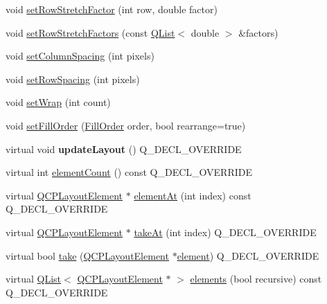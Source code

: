 \begin{DoxyCompactItemize}
\item 
void \hyperlink{class_q_c_p_layout_grid_a7b0273de5369bd93d942edbaf5b166ec}{set\+Row\+Stretch\+Factor} (int row, double factor)
\item 
void \hyperlink{class_q_c_p_layout_grid_a200b45f9c908f96ebadaa3c8d87a2782}{set\+Row\+Stretch\+Factors} (const \hyperlink{class_q_list}{Q\+List}$<$ double $>$ \&factors)
\item 
void \hyperlink{class_q_c_p_layout_grid_a3a49272aba32bb0fddc3bb2a45a3dba0}{set\+Column\+Spacing} (int pixels)
\item 
void \hyperlink{class_q_c_p_layout_grid_aaef2cd2d456197ee06a208793678e436}{set\+Row\+Spacing} (int pixels)
\item 
void \hyperlink{class_q_c_p_layout_grid_ab36af18d77e4428386d02970382ee598}{set\+Wrap} (int count)
\item 
void \hyperlink{class_q_c_p_layout_grid_affc2f3cfd22f28698c5b29b960d2a391}{set\+Fill\+Order} (\hyperlink{class_q_c_p_layout_grid_a7d49ee08773de6b2fd246edfed353cca}{Fill\+Order} order, bool rearrange=true)
\item 
\mbox{\label{class_q_c_p_layout_grid_a6cf43f14d3fa335fd8758561ccf1f78c}} 
virtual void {\bfseries update\+Layout} () Q\+\_\+\+D\+E\+C\+L\+\_\+\+O\+V\+E\+R\+R\+I\+DE
\item 
virtual int \hyperlink{class_q_c_p_layout_grid_a9a8942aface780a02445ebcf14c48513}{element\+Count} () const Q\+\_\+\+D\+E\+C\+L\+\_\+\+O\+V\+E\+R\+R\+I\+DE
\item 
virtual \hyperlink{class_q_c_p_layout_element}{Q\+C\+P\+Layout\+Element} $\ast$ \hyperlink{class_q_c_p_layout_grid_a4288f174082555f6bd92021bdedb75dc}{element\+At} (int index) const Q\+\_\+\+D\+E\+C\+L\+\_\+\+O\+V\+E\+R\+R\+I\+DE
\item 
virtual \hyperlink{class_q_c_p_layout_element}{Q\+C\+P\+Layout\+Element} $\ast$ \hyperlink{class_q_c_p_layout_grid_a17dd220234d1bbf8835abcc666384d45}{take\+At} (int index) Q\+\_\+\+D\+E\+C\+L\+\_\+\+O\+V\+E\+R\+R\+I\+DE
\item 
virtual bool \hyperlink{class_q_c_p_layout_grid_aee961c2eb6cf8a85dcbc5a7d7b6c1a00}{take} (\hyperlink{class_q_c_p_layout_element}{Q\+C\+P\+Layout\+Element} $\ast$\hyperlink{class_q_c_p_layout_grid_a602b426609b4411cf6a93c3ddf3a381a}{element}) Q\+\_\+\+D\+E\+C\+L\+\_\+\+O\+V\+E\+R\+R\+I\+DE
\item 
virtual \hyperlink{class_q_list}{Q\+List}$<$ \hyperlink{class_q_c_p_layout_element}{Q\+C\+P\+Layout\+Element} $\ast$ $>$ \hyperlink{class_q_c_p_layout_grid_a7d5b968b4cf57393e9e387976d91f8f7}{elements} (bool recursive) const Q\+\_\+\+D\+E\+C\+L\+\_\+\+O\+V\+E\+R\+R\+I\+DE

\end{DoxyCompactItemize}
